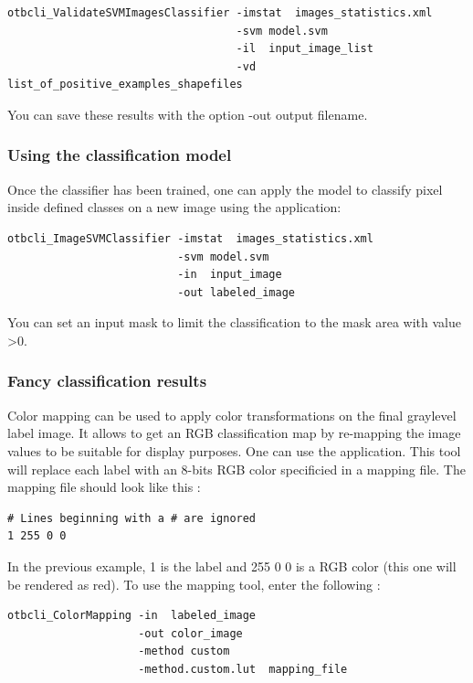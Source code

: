 \begin{verbatim}
otbcli_ValidateSVMImagesClassifier -imstat  images_statistics.xml
                                   -svm model.svm
                                   -il  input_image_list
                                   -vd  list_of_positive_examples_shapefiles
\end{verbatim}

You can save these results with the option -out output filename.

\subsubsection{Using the classification model}
Once the classifier has been trained, one can apply the model to classify
pixel inside defined classes on a new image using the
 application:

\begin{verbatim}
otbcli_ImageSVMClassifier -imstat  images_statistics.xml
                          -svm model.svm
                          -in  input_image
                          -out labeled_image
\end{verbatim}

You can set an input mask to limit the classification to the mask area with
value \textgreater 0.

\subsubsection{Fancy classification results}
\label{ssec:classificationcolormapping}
Color mapping can be used to apply color transformations on the final
graylevel label image. It allows to get an RGB classification map
by re-mapping the image values to be suitable for display purposes.
One can use the  application. This tool will
replace each label with an 8-bits RGB color specificied in a mapping
file. The mapping file should look like this :

\begin{verbatim}
# Lines beginning with a # are ignored
1 255 0 0
\end{verbatim}

In the previous example, 1 is the label and 255 0 0 is a RGB color
(this one will be rendered as red). To use the mapping tool, enter
the following :

\begin{verbatim}
otbcli_ColorMapping -in  labeled_image
                    -out color_image
                    -method custom
                    -method.custom.lut  mapping_file
\end{verbatim}

